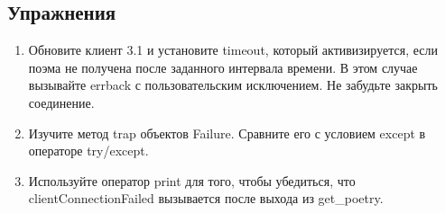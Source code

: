 \subsection{Упражнения}

\begin{enumerate}
\item Обновите клиент 3.1 и установите timeout, который 
активизируется, если поэма не получена после заданного 
интервала времени. В этом случае вызывайте errback с пользовательским исключением. 
Не забудьте закрыть соединение. 
\item Изучите метод trap объектов Failure. Сравните его с условием except в операторе try/except.
\item Используйте оператор print для того, чтобы убедиться, что clientConnectionFailed 
вызывается после выхода из get\_poetry.
\end{enumerate}

